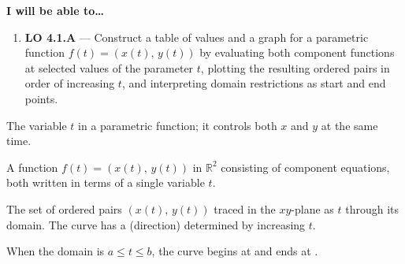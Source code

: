 \documentclass[10pt]{article}
\begin{document}
\namedateperiod

\vspace{0.10in}

\begin{objectivebox}
\textbf{I will be able to\ldots}
\begin{enumerate}[leftmargin=1.5em, itemsep=4pt]
  \item \textbf{LO 4.1.A} --- Construct a table of values and a graph
    for a parametric function $f(t) = (x(t),\, y(t))$ by evaluating both
    component functions at selected values of the parameter $t$, plotting
    the resulting ordered pairs in order of increasing $t$, and
    interpreting domain restrictions as start and end points. \writeline
\end{enumerate}
\end{objectivebox}

\vspace{0.08in}

\begin{vocabbox}
\begin{description}[leftmargin=0pt, itemsep=6pt]
  \item[\termblanklong{parameter}]
    The \underline{\hspace{3cm}} variable $t$ in a parametric function;
    it controls both $x$ and $y$ at the same time.

  \item[\termblanklong{parametric function}]
    A function $f(t) = (x(t),\, y(t))$ in $\mathbb{R}^2$ consisting of
    \underline{\hspace{2cm}} component equations, both written in terms
    of a single variable $t$.

  \item[\termblanklong{parametric curve}]
    The set of ordered pairs $(x(t),\, y(t))$ traced in the $xy$-plane
    as $t$ \underline{\hspace{2.5cm}} through its domain.
    The curve has a \underline{\hspace{2.5cm}} (direction) determined
    by increasing $t$.

  \item[\termblanklong{start / end point}]
    When the domain is $a \le t \le b$, the curve begins at
    \underline{\hspace{2.5cm}} and ends at \underline{\hspace{2.5cm}}.
\end{description}
\end{vocabbox}
\end{document}

